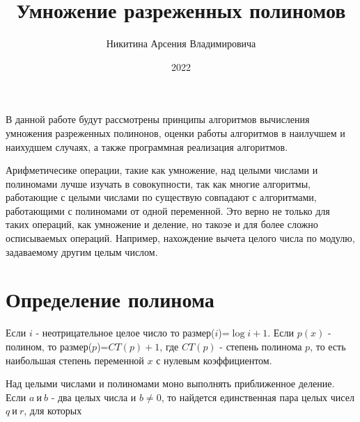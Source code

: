 \documentclass[bachelor, och, labwork]{shiza}
\begin{document}

\title{Умножение разреженных полиномов}





\author{Никитина Арсения Владимировича}



\date{2022}

\maketitle

\tableofcontents

\intro
В данной работе будут рассмотрены принципы алгоритмов вычисления умножения 
разреженных полинонов, оценки работы алгоритмов в наилучшем и наихудшем случаях,
а также программная реализация алгоритмов. 

Арифметичесике операции, такие как умножение, над целыми числами и полиномами
лучше изучать в совокупности, так как многие алгоритмы, работающие с целыми 
числами по существую совпадают с алгоритмами, работающими с полиномами от одной
переменной. Это верно не только для таких операций, как умножение и деление, но
такоэе и для более сложно осписываемых операций. Например, нахождение вычета
целого числа по модулю, задаваемому другим целым числом.


\section{Определение полинома}

Если $i$ - неотрицательное целое число то размер($i$)=$\log i + 1$. Если $p(x)$
- полином, то размер($p$)=$CT(p) + 1$, где $CT(p)$ - степень полинома $p$, то
есть наибольшая степень переменной $x$ с нулевым коэффициентом.

Над целыми числами и полиномами моно выполнять приближенное деление. Если 
$a ~\text{и}~ b$ - два целых числа и $b \not= 0$, то найдется единственная пара
целых чисел $q ~\text{и}~ r$, для которых
\end{document}
